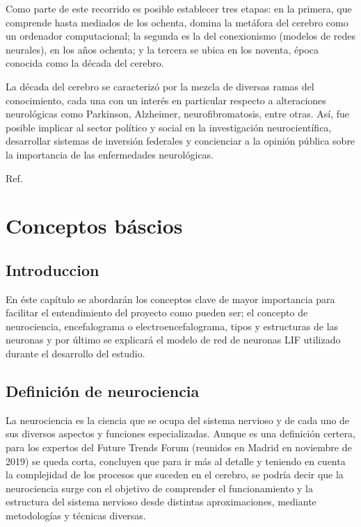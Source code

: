 \documentclass[oneside,openright,titlepage,numbers=noenddot,openany,headinclude,footinclude=true,
cleardoublepage=empty,abstractoff,BCOR=5mm,paper=a4,fontsize=12pt,main=spanish]{scrreprt}
\begin{document}
Como parte de este recorrido es posible establecer tres etapas: en la primera, que comprende hasta mediados de los ochenta, domina la metáfora del cerebro como un ordenador computacional; la segunda es la del conexionismo (modelos de redes neurales), en los años ochenta; y la tercera se ubica en los noventa, época conocida como la década del cerebro.

La década del cerebro se caracterizó por la mezcla de diversas ramas del conocimiento, cada una con un interés en particular respecto a alteraciones neurológicas como Parkinson, Alzheimer, neurofibromatosis, entre otras. Así, fue posible implicar al sector político y social en la investigación neurocientífica, desarrollar sistemas de inversión federales y concienciar a la opinión pública sobre la importancia de las enfermedades neurológicas.

Ref. \cite{evolucioncerebro}

\chapter{Conceptos báscios}\label{part:concepts}

\section{Introduccion}\label{part:introduction}

En éste capítulo se abordarán los conceptos clave de mayor importancia para facilitar el entendimiento del proyecto como pueden ser; el concepto de neurociencia, encefalograma o electroencefalograma, tipos y estructuras de las neuronas y por último se explicará el modelo de red de neuronas LIF utilizado durante el desarrollo del estudio.

\section{Definición de neurociencia}\label{part:neurociencia}

 La neurociencia es la ciencia que se ocupa del sistema nervioso y de cada uno de sus diversos aspectos y funciones especializadas. Aunque es una definición certera, para los expertos del Future Trends Forum (reunidos en Madrid en noviembre de 2019) se queda corta, concluyen que para ir más al detalle y teniendo en cuenta la complejidad de los procesos que suceden en el cerebro, se podría decir que la neurociencia surge con el objetivo de comprender el funcionamiento y la estructura del sistema nervioso desde distintas aproximaciones, mediante metodologías y técnicas diversas. 
 
\end{document}

